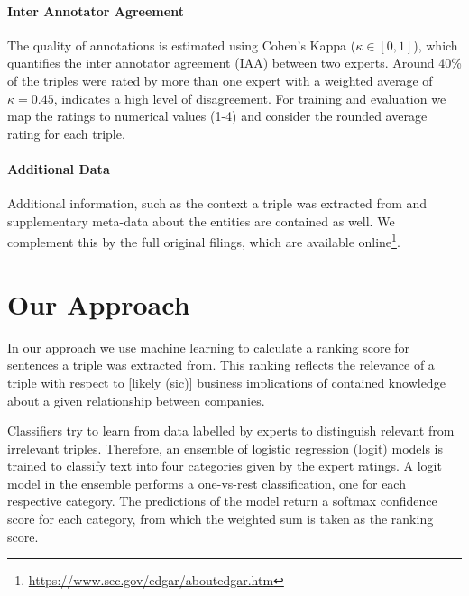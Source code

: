 {\setlength{\parindent}{0cm}
\paragraph{\textbf{Inter Annotator Agreement}}
The quality of annotations is estimated using Cohen's Kappa ($\kappa\in [0,1]$), which quantifies the inter annotator agreement (IAA) between two experts\cite{ir}.
Around 40\% of the triples were rated by more than one expert with a weighted average of $\overline{\kappa}=0.45$, indicates a high level of disagreement.
For training and evaluation we map the ratings to numerical values (1-4) and consider the rounded average rating for each triple.
}

{\setlength{\parindent}{0cm}
\paragraph{\textbf{Additional Data}}
Additional information, such as the context a triple was extracted from and supplementary meta-data about the entities are contained as well.
We complement this by the full original filings, which are available online\footnote{\url{https://www.sec.gov/edgar/aboutedgar.htm}}.
}

\section{Our Approach}
In our approach we use machine learning to calculate a ranking score for sentences a triple was extracted from.
This ranking reflects the relevance of a triple with respect to [likely (sic)] business implications of contained knowledge about a given relationship between companies.

Classifiers try to learn from data labelled by experts to distinguish relevant from irrelevant triples.
Therefore, an ensemble of logistic regression (logit) models is trained to classify text into four categories given by the expert ratings.
A logit model in the ensemble performs a one-vs-rest classification, one for each respective category.
The predictions of the model return a softmax confidence score for each category, from which the weighted sum is taken as the ranking score.


